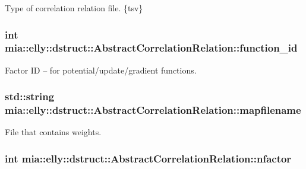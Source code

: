 Type of correlation relation file. \{tsv\} \hypertarget{classmia_1_1elly_1_1dstruct_1_1_abstract_correlation_relation_ac7216c599394d0b1026bb4f7a161f6a4}{
\subsubsection[{function\-\_\-id}]{\setlength{\rightskip}{0pt plus 5cm}int mia\-::elly\-::dstruct\-::\-Abstract\-Correlation\-Relation\-::function\-\_\-id}}\label{classmia_1_1elly_1_1dstruct_1_1_abstract_correlation_relation_ac7216c599394d0b1026bb4f7a161f6a4}
Factor I\-D -- for potential/update/gradient functions. \hypertarget{classmia_1_1elly_1_1dstruct_1_1_abstract_correlation_relation_a528970ab644de5fa8958bc8b26917664}{
\subsubsection[{mapfilename}]{\setlength{\rightskip}{0pt plus 5cm}std\-::string mia\-::elly\-::dstruct\-::\-Abstract\-Correlation\-Relation\-::mapfilename}}\label{classmia_1_1elly_1_1dstruct_1_1_abstract_correlation_relation_a528970ab644de5fa8958bc8b26917664}
File that contains weights. \hypertarget{classmia_1_1elly_1_1dstruct_1_1_abstract_correlation_relation_a65756a92a296e0e9041b043cee64d8b0}{
\subsubsection[{nfactor}]{\setlength{\rightskip}{0pt plus 5cm}int mia\-::elly\-::dstruct\-::\-Abstract\-Correlation\-Relation\-::nfactor}}\label{classmia_1_1elly_1_1dstruct_1_1_abstract_correlation_relation_a65756a92a296e0e9041b043cee64d8b0}
